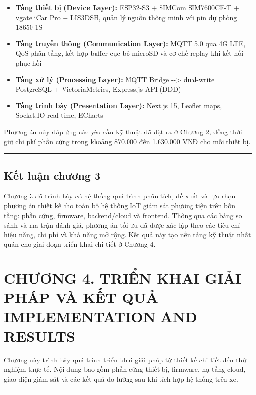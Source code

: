 \documentclass[13pt,a4paper]{extarticle}
\renewcommand{\\}{\thesislongtableorignewline\hline}%
\newcommand{\chapterheading}[1]{\clearpage\section*{#1}\setcounter{subsection}{0}}
\providecommand{\tightlist}{%
  \setlength{\itemsep}{0pt}\setlength{\parskip}{0pt}}
\begin{document}
\begin{itemize}
\tightlist
\item
  \textbf{Tầng thiết bị (Device Layer):} ESP32-S3 + SIMCom SIM7600CE-T +
  vgate iCar Pro + LIS3DSH, quản lý nguồn thông minh với pin dự phòng
  18650 1S
\item
  \textbf{Tầng truyền thông (Communication Layer):} MQTT 5.0 qua 4G LTE,
  QoS phân tầng, kết hợp buffer cục bộ microSD và cơ chế replay khi kết
  nối phục hồi
\item
  \textbf{Tầng xử lý (Processing Layer):} MQTT Bridge -\/-\textgreater{}
  dual-write PostgreSQL + VictoriaMetrics, Express.js API (DDD)
\item
  \textbf{Tầng trình bày (Presentation Layer):} Next.js 15, Leaflet
  maps, Socket.IO real-time, ECharts
\end{itemize}

Phương án này đáp ứng các yêu cầu kỹ thuật đã đặt ra ở Chương 2, đồng
thời giữ chi phí phần cứng trong khoảng 870.000 đến 1.630.000 VNĐ cho
mỗi thiết bị.

\begin{center}\rule{0.5\linewidth}{0.5pt}\end{center}

\subsection{Kết luận chương
3}\label{kux1ebft-luux1eadn-chux1b0ux1a1ng-3}

Chương 3 đã trình bày có hệ thống quá trình phân tích, đề xuất và lựa
chọn phương án thiết kế cho toàn bộ hệ thống IoT giám sát phương tiện
trên bốn tầng: phần cứng, firmware, backend/cloud và frontend. Thông qua
các bảng so sánh và ma trận đánh giá, phương án tối ưu đã được xác lập
theo các tiêu chí hiệu năng, chi phí và khả năng mở rộng. Kết quả này
tạo nền tảng kỹ thuật nhất quán cho giai đoạn triển khai chi tiết ở
Chương 4.

\chapterheading{CHƯƠNG 4. TRIỂN KHAI GIẢI PHÁP VÀ KẾT QUẢ -- IMPLEMENTATION AND RESULTS}

Chương này trình bày quá trình triển khai giải pháp từ thiết kế chi tiết
đến thử nghiệm thực tế. Nội dung bao gồm phần cứng thiết bị, firmware,
hạ tầng cloud, giao diện giám sát và các kết quả đo lường sau khi tích
hợp hệ thống trên xe.

\begin{center}\rule{0.5\linewidth}{0.5pt}\end{center}
\end{document}
